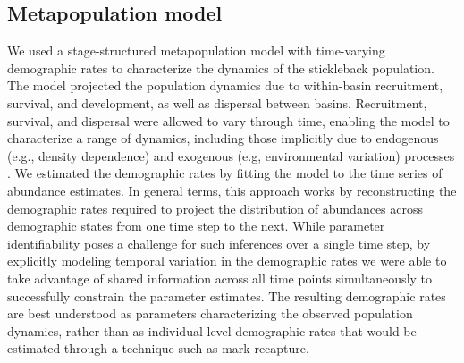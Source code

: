 \documentclass[11pt]{article}
\begin{document}
\subsection*{Metapopulation model} 

We used a stage-structured metapopulation model \citep{caswell2001matrix}
with time-varying demographic rates
to characterize the dynamics of the stickleback population. 
The model projected the population dynamics due to 
within-basin recruitment, survival, and development, 
as well as dispersal between basins. 
Recruitment, survival, and dispersal were allowed to vary through time,
enabling the model to characterize a range of dynamics, 
including those implicitly due to endogenous (e.g., density dependence) 
and exogenous (e.g, environmental variation) processes
\citep{zeng1998, ives2012}. 
We estimated the demographic rates by  
fitting the model to the time series of abundance estimates. 
In general terms, this approach works by reconstructing the demographic rates required
to project the distribution of abundances across demographic states 
from one time step to the next. 
While parameter identifiability poses a challenge for such inferences over a single time
step, by explicitly modeling temporal variation in the demographic rates we were able 
to take advantage of shared information across all time points simultaneously to 
successfully constrain the parameter estimates.
The resulting demographic rates are best understood as parameters 
characterizing the observed population dynamics, 
rather than as individual-level demographic rates that would be estimated through a 
technique such as mark-recapture. 
\end{document}
